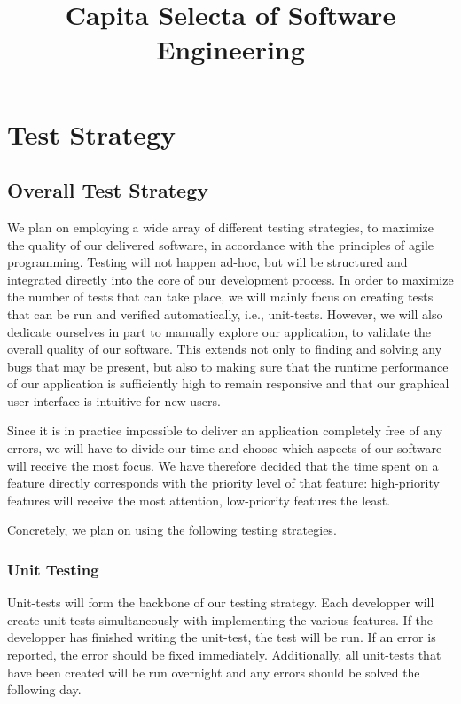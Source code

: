 \documentclass {article}
\title {Capita Selecta of Software Engineering}
\begin{document}
\maketitle
 
\section{Test Strategy}

\subsection{Overall Test Strategy}
We plan on employing a wide array of different testing strategies, to maximize the quality of our delivered software, in accordance with the principles of agile programming. Testing will not happen ad-hoc, but will be structured and integrated directly into the core of our development process.
In order to maximize the number of tests that can take place, we will mainly focus on creating tests that can be run and verified automatically, i.e., unit-tests.
However, we will also dedicate ourselves in part to manually explore our application, to validate the overall quality of our software. This extends not only to finding and solving any bugs that may be present, but also to making sure that the runtime performance of our application is sufficiently high to remain responsive and that our graphical user interface is intuitive for new users.

Since it is in practice impossible to deliver an application completely free of any errors, we will have to divide our time and choose which aspects of our software will receive the most focus. We have therefore decided that the time spent on a feature directly corresponds with the priority level of that feature: high-priority features will receive the most attention, low-priority features the least.

Concretely, we plan on using the following testing strategies.

\subsubsection*{Unit Testing}
Unit-tests will form the backbone of our testing strategy. Each developper will create unit-tests simultaneously with implementing the various features.
If the developper has finished writing the unit-test, the test will be run. If an error is reported, the error should be fixed immediately.
Additionally, all unit-tests that have been created will be run overnight and any errors should be solved the following day.
\end{document}
